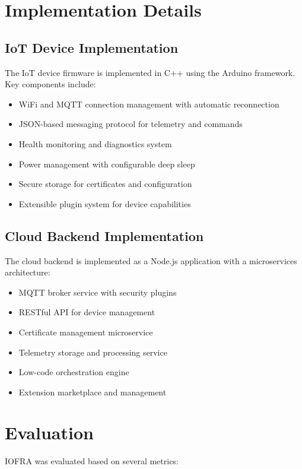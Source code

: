 \documentclass[conference]{IEEEtran}
\begin{document}
\section{Implementation Details}

\subsection{IoT Device Implementation}
The IoT device firmware is implemented in C++ using the Arduino framework. Key components include:

\begin{itemize}
    \item WiFi and MQTT connection management with automatic reconnection
    \item JSON-based messaging protocol for telemetry and commands
    \item Health monitoring and diagnostics system
    \item Power management with configurable deep sleep
    \item Secure storage for certificates and configuration
    \item Extensible plugin system for device capabilities
\end{itemize}

\subsection{Cloud Backend Implementation}
The cloud backend is implemented as a Node.js application with a microservices architecture:

\begin{itemize}
    \item MQTT broker service with security plugins
    \item RESTful API for device management
    \item Certificate management microservice
    \item Telemetry storage and processing service
    \item Low-code orchestration engine
    \item Extension marketplace and management
\end{itemize}

\section{Evaluation}
IOFRA was evaluated based on several metrics:
\end{document}
